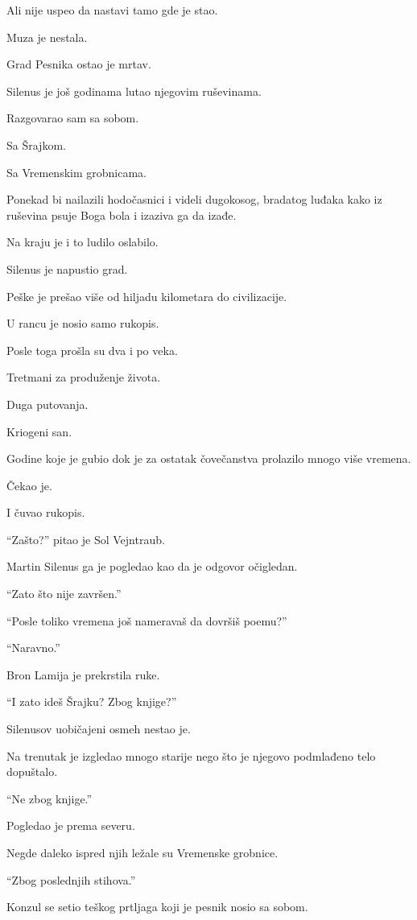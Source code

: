 Ali nije uspeo da nastavi tamo gde je stao.

Muza je nestala.

Grad Pesnika ostao je mrtav.

Silenus je još godinama lutao njegovim ruševinama.

Razgovarao sam sa sobom.

Sa Šrajkom.

Sa Vremenskim grobnicama.

Ponekad bi nailazili hodočasnici i videli dugokosog, bradatog luđaka kako iz ruševina psuje Boga bola i izaziva ga da izađe.

Na kraju je i to ludilo oslabilo.

Silenus je napustio grad.

Peške je prešao više od hiljadu kilometara do civilizacije.

U rancu je nosio samo rukopis.

\bigskip

Posle toga prošla su dva i po veka.

Tretmani za produženje života.

Duga putovanja.

Kriogeni san.

Godine koje je gubio dok je za ostatak čovečanstva prolazilo mnogo više vremena.

Čekao je.

I čuvao rukopis.

``Zašto?'' pitao je Sol Vejntraub.

Martin Silenus ga je pogledao kao da je odgovor očigledan.

``Zato što nije završen.''

``Posle toliko vremena još nameravaš da dovršiš poemu?''

``Naravno.''

Bron Lamija je prekrstila ruke.

``I zato ideš Šrajku? Zbog knjige?''

Silenusov uobičajeni osmeh nestao je.

Na trenutak je izgledao mnogo starije nego što je njegovo podmlađeno telo dopuštalo.

``Ne zbog knjige.''

Pogledao je prema severu.

Negde daleko ispred njih ležale su Vremenske grobnice.

``Zbog poslednjih stihova.''

Konzul se setio teškog prtljaga koji je pesnik nosio sa sobom.

